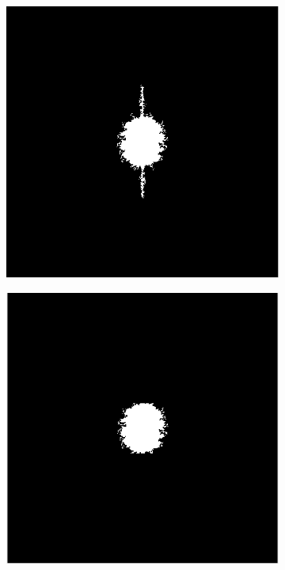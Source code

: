 \documentclass{article}
\begin{document}
\begin{figure}[H]
\begin{subfigure}[b]{0.32\textwidth}
		\caption{}
		\label{fig:step4lpf}
	\end{subfigure}%
	\hspace{\fill}
	\begin{subfigure}[b]{0.32\textwidth}
		\includegraphics[width=\linewidth]{step5}
		\caption{}
		\label{fig:step5lpf}
	\end{subfigure}%
	\hspace{\fill}
	\begin{subfigure}[b]{0.32\textwidth}
		\includegraphics[width=\linewidth]{step6}

\end{subfigure}
\end{figure}
\end{document}
